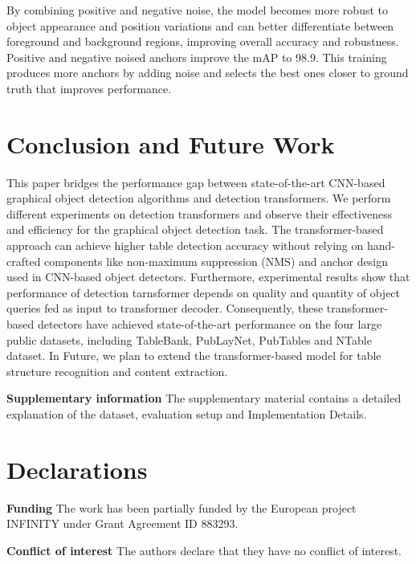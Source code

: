\documentclass[sn-mathphys]{sn-jnl}\jyear{2021}\theoremstyle{thmstyleone}\newtheorem{theorem}{Theorem}\newtheorem{proposition}[theorem]{Proposition}\theoremstyle{thmstyletwo}\newtheorem{example}{Example}\newtheorem{remark}{Remark}\theoremstyle{thmstylethree}\newtheorem{definition}{Definition}\usepackage{amsmath}
\begin{document}
 By combining positive and negative noise, the model becomes more robust to object appearance and position variations and can better differentiate between foreground and background regions, improving overall accuracy and robustness. Positive and negative noised anchors improve the mAP to 98.9. This training produces more anchors by adding noise and selects the best ones closer to ground truth that improves performance.\\

\section{Conclusion and Future Work}
\label{sec:conclusion}
This paper bridges the performance gap between state-of-the-art CNN-based graphical object detection algorithms and detection transformers. We perform different experiments on detection transformers and observe their effectiveness and efficiency for the graphical object detection task. The transformer-based approach can achieve higher table detection accuracy without relying on hand-crafted components like non-maximum suppression (NMS) and anchor design used in CNN-based object detectors. Furthermore, experimental results show that performance of detection tarnsformer depends on quality and quantity of object queries fed as input to transformer decoder. Consequently, these transformer-based detectors have achieved state-of-the-art performance on the four large public datasets, including TableBank, PubLayNet, PubTables and NTable dataset. In Future, we plan to extend the transformer-based model for table structure recognition and content extraction.

\noindent\textbf{Supplementary information}
The supplementary material contains a detailed explanation of the dataset,
evaluation setup and Implementation Details.

\section*{Declarations}
\noindent\textbf{Funding} The work has been partially funded by the European project INFINITY under Grant Agreement ID 883293.\par
\noindent\textbf{Conflict of interest} The authors declare that they have no conflict of interest.

\end{document}
